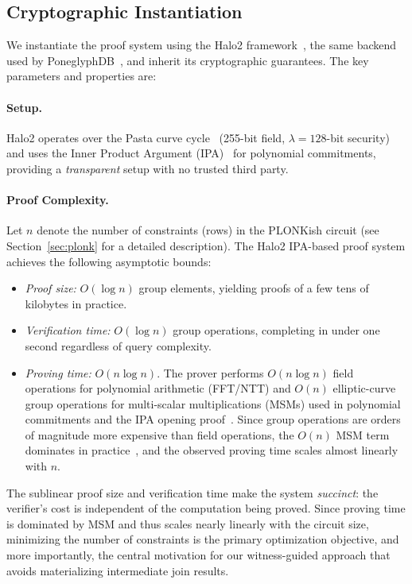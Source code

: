 \documentclass[sigconf]{acmart}
\renewcommand{\emph}[1]{\textit{#1}}
\begin{document}
\subsection{Cryptographic Instantiation}
\label{subsec:crypto}
We instantiate the proof system using the Halo2 framework~\cite{halo2,halo2-protocol}, the same backend used by PoneglyphDB~\cite{gu2025poneglyphdb}, and inherit its cryptographic guarantees. The key parameters and properties are:

\vspace{-0.1in}
\paragraph{Setup.}
Halo2 operates over the Pasta curve cycle~\cite{halo2} (255-bit field, $\lambda{=}128$-bit security) and uses the Inner Product Argument (IPA)~\cite{bowe2020recursive} for polynomial commitments, providing a \emph{transparent} setup with no trusted third party.

\vspace{-0.1in}
\paragraph{Proof Complexity.}
Let $n$ denote the number of constraints (rows) in the PLONKish circuit (see Section~\ref{sec:plonk} for a detailed description). The Halo2 IPA-based proof system achieves the following asymptotic bounds:
\begin{itemize}[leftmargin=*]
    \item \emph{Proof size:} $O(\log n)$ group elements, yielding proofs of a few tens of kilobytes in practice.
    \item \emph{Verification time:} $O(\log n)$ group operations, completing in under one second regardless of query complexity.
    \item \emph{Proving time:} $O(n \log n)$. The prover performs $O(n \log n)$ field operations for polynomial arithmetic (FFT/NTT) and $O(n)$ elliptic-curve group operations for multi-scalar multiplications (MSMs) used in polynomial commitments and the IPA opening proof~\cite{gabizon2019plonk,bowe2020recursive}. Since group operations are orders of magnitude more expensive than field operations, the $O(n)$ MSM term dominates in practice~\cite{gu2025poneglyphdb}, and the observed proving time scales almost linearly with $n$.
\end{itemize}
The sublinear proof size and verification time make the system \emph{succinct}: the verifier's cost is independent of the computation being proved. Since proving time is dominated by MSM and thus scales nearly linearly with the circuit size, minimizing the number of constraints is the primary optimization objective, and more importantly, the central motivation for our witness-guided approach that avoids materializing intermediate join results.
\end{document}

